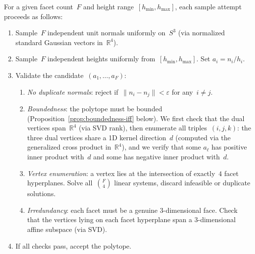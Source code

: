 For a given facet count~$F$ and height range~$[h_{\min}, h_{\max}]$, each
sample attempt proceeds as follows:
\begin{enumerate}
  \item Sample~$F$ independent unit normals uniformly on~$S^3$
    (via normalized standard Gaussian vectors in~$\mathbb{R}^4$).
  \item Sample~$F$ independent heights uniformly from~$[h_{\min}, h_{\max}]$.
    Set $a_i = n_i / h_i$.
  \item Validate the candidate~$(a_1, \ldots, a_F)$:
  \begin{enumerate}
    \item \emph{No duplicate normals}: reject if~$\|n_i - n_j\| < \varepsilon$
      for any~$i \ne j$.
    \item \emph{Boundedness}: the polytope must be bounded
      (Proposition~\ref{prop:boundedness-iff} below). We first check that the
      dual vertices span~$\mathbb{R}^4$ (via SVD rank), then enumerate all
      triples~$(i,j,k)$: the three dual vertices share a 1D kernel direction~$d$
      (computed via the generalized cross product in~$\mathbb{R}^4$), and we
      verify that some $a_\ell$ has positive inner product with~$d$ and some
      has negative inner product with~$d$.
    \item \emph{Vertex enumeration}: a vertex lies at the intersection of
      exactly~$4$ facet hyperplanes. Solve all~$\binom{F}{4}$ linear systems,
      discard infeasible or duplicate solutions.
    \item \emph{Irredundancy}: each facet must be a genuine 3-dimensional
      face. Check that the vertices lying on each facet hyperplane span a
      3-dimensional affine subspace (via SVD).
  \end{enumerate}
  \item If all checks pass, accept the polytope.
\end{enumerate}

